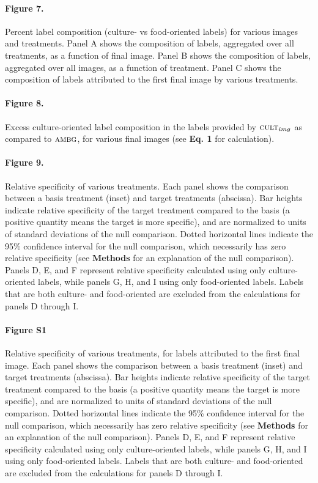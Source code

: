 \documentclass[a4paper]{report}
\begin{document}
\paragraph{Figure 7.}
Percent label composition (culture- vs food-oriented labels) for 
various images and treatments.  Panel A shows the 
composition of labels, aggregated over all treatments, as a function of 
final image.
Panel B shows the composition of labels, aggregated over all images, as
a function of treatment.  Panel C shows the composition of labels 
attributed to the first final image by various treatments.

\paragraph{Figure 8.}
Excess culture-oriented label composition in the labels provided
by $\textsc{cult}_{img}$ as compared to $\textsc{ambg}$, for various
final images (see \textbf{Eq. 1} for calculation).

\paragraph{Figure 9.}
Relative specificity of various treatments.
Each panel shows the comparison between a basis treatment (inset) and 
target treatments (abscissa).
Bar heights indicate relative specificity of the target 
treatment compared to the basis (a positive quantity means the target 
is more specific), and are normalized to units of standard 
deviations of the null comparison.  Dotted horizontal lines indicate
the 95\% confidence interval for the null comparison, which necessarily
has zero relative specificity (see \textbf{Methods} 
for an explanation of the null comparison).  Panels D, E, and F 
represent relative specificity calculated using only culture-oriented
labels, while panels G, H, and I using only food-oriented labels.
Labels that are both culture- and food-oriented are excluded from the
calculations for panels D through I.

\paragraph{Figure S1}
Relative specificity of various treatments, for labels attributed
to the first final image.
Each panel shows the comparison between a basis treatment (inset) and 
target treatments (abscissa).
Bar heights indicate relative specificity of the target 
treatment compared to the basis (a positive quantity means the target 
is more specific), and are normalized to units of standard 
deviations of the null comparison.  Dotted horizontal lines indicate
the 95\% confidence interval for the null comparison, which necessarily
has zero relative specificity (see \textbf{Methods} 
for an explanation of the null comparison).  Panels D, E, and F 
represent relative specificity calculated using only culture-oriented
labels, while panels G, H, and I using only food-oriented labels.
Labels that are both culture- and food-oriented are excluded from the
calculations for panels D through I.
\end{document}
